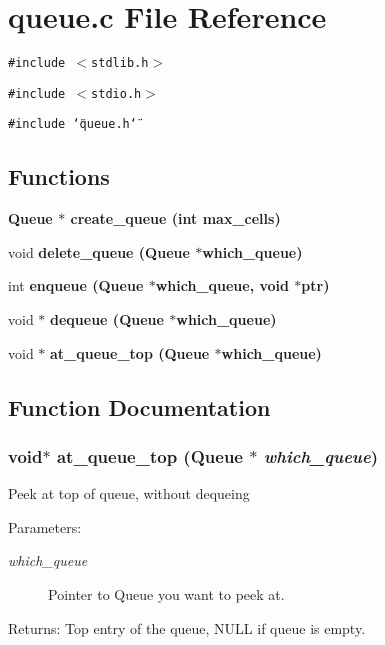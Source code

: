 \section{queue.c File Reference}
\label{queue_8c}
{\tt \#include $<$stdlib.h$>$}\par
{\tt \#include $<$stdio.h$>$}\par
{\tt \#include \char`\"{}queue.h\char`\"{}}\par
\subsection*{Functions}
\begin{CompactItemize}
\item 
\bf{Queue} $\ast$ \bf{create\_\-queue} (int max\_\-cells)
\item 
void \bf{delete\_\-queue} (\bf{Queue} $\ast$which\_\-queue)
\item 
int \bf{enqueue} (\bf{Queue} $\ast$which\_\-queue, void $\ast$ptr)
\item 
void $\ast$ \bf{dequeue} (\bf{Queue} $\ast$which\_\-queue)
\item 
void $\ast$ \bf{at\_\-queue\_\-top} (\bf{Queue} $\ast$which\_\-queue)
\end{CompactItemize}


\subsection{Function Documentation}
\subsubsection{\setlength{\rightskip}{0pt plus 5cm}void$\ast$ at\_\-queue\_\-top (\bf{Queue} $\ast$ {\em which\_\-queue})}\label{queue_8c_70ca1dde791d8b919984ca5c98da8ade}


Peek at top of queue, without dequeing \begin{Desc}
\item[Parameters:]
\begin{description}
\item[{\em which\_\-queue}]Pointer to Queue you want to peek at. \end{description}
\end{Desc}
\begin{Desc}
\item[Returns:]Top entry of the queue, NULL if queue is empty. \end{Desc}
